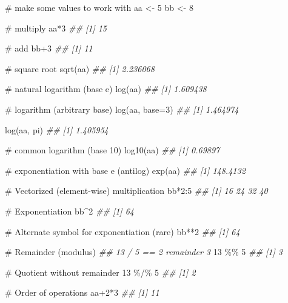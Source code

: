 \documentclass[
  13,
  letterpaper,
]{report}
\newenvironment{Shaded}{\begin{snugshade}}{\end{snugshade}}
\newcommand{\AttributeTok}[1]{\textcolor[rgb]{0.40,0.45,0.13}{#1}}
\newcommand{\CommentTok}[1]{\textcolor[rgb]{0.37,0.37,0.37}{#1}}
\newcommand{\DecValTok}[1]{\textcolor[rgb]{0.68,0.00,0.00}{#1}}
\newcommand{\DocumentationTok}[1]{\textcolor[rgb]{0.37,0.37,0.37}{\textit{#1}}}
\newcommand{\FunctionTok}[1]{\textcolor[rgb]{0.28,0.35,0.67}{#1}}
\newcommand{\NormalTok}[1]{\textcolor[rgb]{0.00,0.23,0.31}{#1}}
\newcommand{\OtherTok}[1]{\textcolor[rgb]{0.00,0.23,0.31}{#1}}
\newcommand{\SpecialCharTok}[1]{\textcolor[rgb]{0.37,0.37,0.37}{#1}}
\begin{document}
\begin{Shaded}
\begin{Highlighting}[]
\CommentTok{\# make some values to work with}
\NormalTok{aa }\OtherTok{\textless{}{-}} \DecValTok{5}
\NormalTok{bb }\OtherTok{\textless{}{-}} \DecValTok{8}

\CommentTok{\# multiply}
\NormalTok{aa}\SpecialCharTok{*}\DecValTok{3}            
\DocumentationTok{\#\# [1] 15}

\CommentTok{\# add}
\NormalTok{bb}\SpecialCharTok{+}\DecValTok{3}            
\DocumentationTok{\#\# [1] 11}

\CommentTok{\# square root}
\FunctionTok{sqrt}\NormalTok{(aa)        }
\DocumentationTok{\#\# [1] 2.236068}

\CommentTok{\# natural logarithm (base e)}
\FunctionTok{log}\NormalTok{(aa)         }
\DocumentationTok{\#\# [1] 1.609438}

\CommentTok{\# logarithm (arbitrary base)}
\FunctionTok{log}\NormalTok{(aa, }\AttributeTok{base=}\DecValTok{3}\NormalTok{) }
\DocumentationTok{\#\# [1] 1.464974}

\FunctionTok{log}\NormalTok{(aa, pi)     }
\DocumentationTok{\#\# [1] 1.405954}

\CommentTok{\# common logarithm (base 10)}
\FunctionTok{log10}\NormalTok{(aa)       }
\DocumentationTok{\#\# [1] 0.69897}

\CommentTok{\# exponentiation with base e (antilog)}
\FunctionTok{exp}\NormalTok{(aa)         }
\DocumentationTok{\#\# [1] 148.4132}

\CommentTok{\# Vectorized (element{-}wise) multiplication}
\NormalTok{bb}\SpecialCharTok{*}\DecValTok{2}\SpecialCharTok{:}\DecValTok{5}          
\DocumentationTok{\#\# [1] 16 24 32 40}

\CommentTok{\# Exponentiation}
\NormalTok{bb}\SpecialCharTok{\^{}}\DecValTok{2}            
\DocumentationTok{\#\# [1] 64}

\CommentTok{\# Alternate symbol for exponentiation (rare)}
\NormalTok{bb}\SpecialCharTok{**}\DecValTok{2}           
\DocumentationTok{\#\# [1] 64}

\CommentTok{\# Remainder (modulus)}
\DocumentationTok{\#\# 13 / 5 == 2 remainder 3}
\DecValTok{13} \SpecialCharTok{\%\%} \DecValTok{5}         
\DocumentationTok{\#\# [1] 3}

\CommentTok{\# Quotient without remainder}
\DecValTok{13} \SpecialCharTok{\%/\%} \DecValTok{5}        
\DocumentationTok{\#\# [1] 2}

\CommentTok{\# Order of operations}
\NormalTok{aa}\SpecialCharTok{+}\DecValTok{2}\SpecialCharTok{*}\DecValTok{3}          
\DocumentationTok{\#\# [1] 11}


\end{Highlighting}
\end{Shaded}
\end{document}
